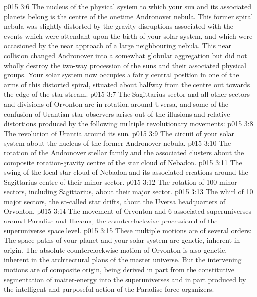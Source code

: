 \vs p015 3:6 The nucleus of the physical system to which your sun and its associated planets belong is the centre of the onetime Andronover nebula. This former spiral nebula was slightly distorted by the gravity disruptions associated with the events which were attendant upon the birth of your solar system, and which were occasioned by the near approach of a large neighbouring nebula. This near collision changed Andronover into a somewhat globular aggregation but did not wholly destroy the two\hyp{}way procession of the suns and their associated physical groups. Your solar system now occupies a fairly central position in one of the arms of this distorted spiral, situated about halfway from the centre out towards the edge of the star stream.
\vs p015 3:7 \pc The Sagittarius sector and all other sectors and divisions of Orvonton are in rotation around Uversa, and some of the confusion of Urantian star observers arises out of the illusions and relative distortions produced by the following multiple revolutionary movements:
\vs p015 3:8 \bibnobreakspace The revolution of Urantia around its sun.
\vs p015 3:9 \bibnobreakspace The circuit of your solar system about the nucleus of the former Andronover nebula.
\vs p015 3:10 \bibnobreakspace The rotation of the Andronover stellar family and the associated clusters about the composite rotation\hyp{}gravity centre of the star cloud of Nebadon.
\vs p015 3:11 \bibnobreakspace The swing of the local star cloud of Nebadon and its associated creations around the Sagittarius centre of their minor sector.
\vs p015 3:12 \bibnobreakspace The rotation of 100 minor sectors, including Sagittarius, about their major sector.
\vs p015 3:13 \bibnobreakspace The whirl of 10 major sectors, the so\hyp{}called star drifts, about the Uversa headquarters of Orvonton.
\vs p015 3:14 \bibnobreakspace The movement of Orvonton and 6 associated superuniverses around Paradise and Havona, the counterclockwise processional of the superuniverse space level.
\vs p015 3:15 \pc These multiple motions are of several orders: The space paths of your planet and your solar system are genetic, inherent in origin. The absolute counterclockwise motion of Orvonton is also genetic, inherent in the architectural plans of the master universe. But the intervening motions are of composite origin, being derived in part from the constitutive segmentation of matter\hyp{}energy into the superuniverses and in part produced by the intelligent and purposeful action of the Paradise force organizers.
